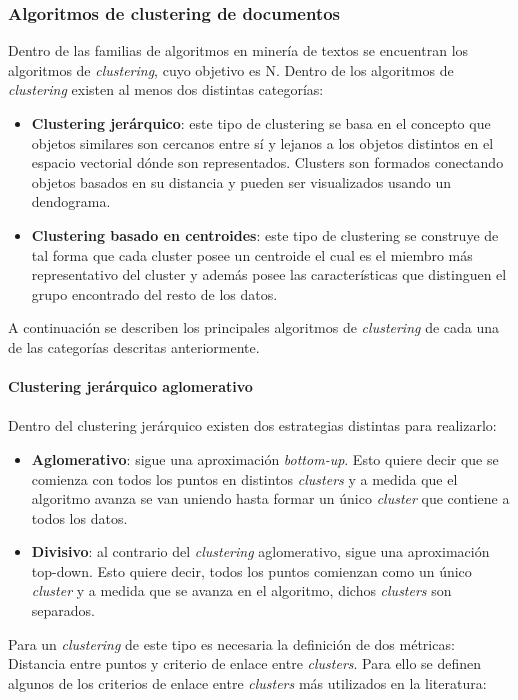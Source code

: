 \subsubsection{Algoritmos de clustering de documentos}
    Dentro de las familias de algoritmos en minería de textos se encuentran los algoritmos de \textit{clustering}, cuyo objetivo es N. Dentro de los algoritmos de \textit{clustering} existen al menos dos distintas categorías:
    \begin{itemize}
        \item \textbf{Clustering jerárquico}: este tipo de clustering se basa en el concepto que objetos similares son cercanos entre sí y lejanos a los objetos distintos en el espacio vectorial dónde son representados. Clusters son formados conectando objetos basados en su distancia y pueden ser visualizados usando un dendograma.
        
        \item \textbf{Clustering basado en centroides}: este tipo de clustering se construye de tal forma que cada cluster posee un centroide el cual es el miembro más representativo del cluster y además posee las características que distinguen el grupo encontrado del resto de los datos.
    \end{itemize}
    A continuación se describen los principales algoritmos de \textit{clustering} de cada una de las categorías descritas anteriormente.
\paragraph{Clustering jerárquico aglomerativo} 
\paragraph*{}Dentro del clustering jerárquico existen dos estrategias distintas para realizarlo:
    \begin{itemize}
        \item \textbf{Aglomerativo}: sigue una aproximación \textit{bottom-up}. Esto quiere decir que se comienza con todos los puntos en distintos \textit{clusters} y a medida que el algoritmo avanza se van uniendo hasta formar un único \textit{cluster} que contiene a todos los datos.
        \item \textbf{Divisivo}: al contrario del \textit{clustering} aglomerativo, sigue una aproximación top-down. Esto quiere decir, todos los puntos comienzan como un único \textit{cluster} y a medida que se avanza en el algoritmo, dichos \textit{clusters} son separados.
    \end{itemize}
    Para un \textit{clustering} de este tipo es necesaria la definición de dos métricas: Distancia entre puntos y criterio de enlace entre \textit{clusters}. Para ello se definen algunos de los criterios de enlace entre \textit{clusters} más utilizados en la literatura:
    
